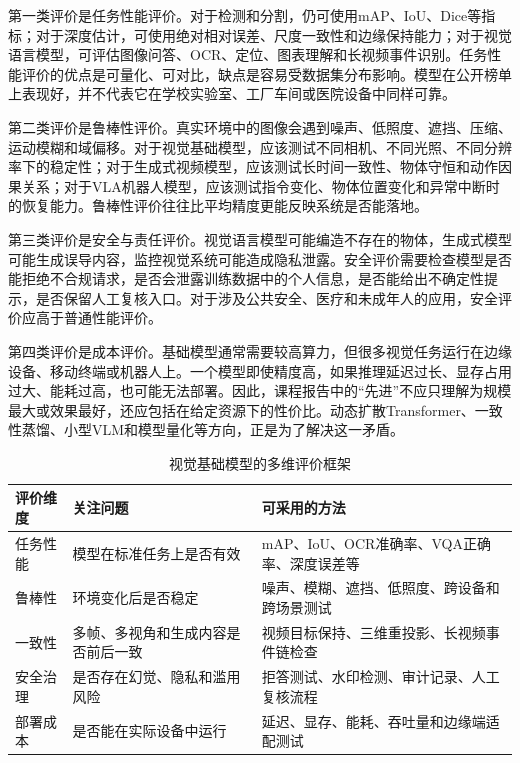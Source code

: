 \documentclass[UTF8,a4paper,12pt]{ctexart}
\begin{document}
第一类评价是任务性能评价。对于检测和分割，仍可使用mAP、IoU、Dice等指标；对于深度估计，可使用绝对相对误差、尺度一致性和边缘保持能力；对于视觉语言模型，可评估图像问答、OCR、定位、图表理解和长视频事件识别。任务性能评价的优点是可量化、可对比，缺点是容易受数据集分布影响。模型在公开榜单上表现好，并不代表它在学校实验室、工厂车间或医院设备中同样可靠。

第二类评价是鲁棒性评价。真实环境中的图像会遇到噪声、低照度、遮挡、压缩、运动模糊和域偏移。对于视觉基础模型，应该测试不同相机、不同光照、不同分辨率下的稳定性；对于生成式视频模型，应该测试长时间一致性、物体守恒和动作因果关系；对于VLA机器人模型，应该测试指令变化、物体位置变化和异常中断时的恢复能力。鲁棒性评价往往比平均精度更能反映系统是否能落地。

第三类评价是安全与责任评价。视觉语言模型可能编造不存在的物体，生成式模型可能生成误导内容，监控视觉系统可能造成隐私泄露。安全评价需要检查模型是否能拒绝不合规请求，是否会泄露训练数据中的个人信息，是否能给出不确定性提示，是否保留人工复核入口。对于涉及公共安全、医疗和未成年人的应用，安全评价应高于普通性能评价。

第四类评价是成本评价。基础模型通常需要较高算力，但很多视觉任务运行在边缘设备、移动终端或机器人上。一个模型即使精度高，如果推理延迟过长、显存占用过大、能耗过高，也可能无法部署。因此，课程报告中的“先进”不应只理解为规模最大或效果最好，还应包括在给定资源下的性价比。动态扩散Transformer、一致性蒸馏、小型VLM和模型量化等方向，正是为了解决这一矛盾。

\begin{table}[htbp]
\centering
\small
\caption{视觉基础模型的多维评价框架}
\begin{tabularx}{\textwidth}{C{2.5cm}Y Y}
\toprule
\textbf{评价维度} & \textbf{关注问题} & \textbf{可采用的方法} \\
\midrule
任务性能 & 模型在标准任务上是否有效 & mAP、IoU、OCR准确率、VQA正确率、深度误差等 \\
鲁棒性 & 环境变化后是否稳定 & 噪声、模糊、遮挡、低照度、跨设备和跨场景测试 \\
一致性 & 多帧、多视角和生成内容是否前后一致 & 视频目标保持、三维重投影、长视频事件链检查 \\
安全治理 & 是否存在幻觉、隐私和滥用风险 & 拒答测试、水印检测、审计记录、人工复核流程 \\
部署成本 & 是否能在实际设备中运行 & 延迟、显存、能耗、吞吐量和边缘端适配测试 \\
\bottomrule
\end{tabularx}
\end{table}
\end{document}
